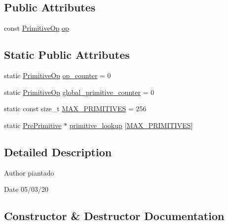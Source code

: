 \subsection*{Public Attributes}
\begin{DoxyCompactItemize}
\item 
const \hyperlink{_instruction_8h_a227278394efd1e2313c727102db09ea9}{Primitive\+Op} \hyperlink{struct_pre_primitive_a209912eb2296e524388fa1f83e7d834b}{op}
\end{DoxyCompactItemize}
\subsection*{Static Public Attributes}
\begin{DoxyCompactItemize}
\item 
static \hyperlink{_instruction_8h_a227278394efd1e2313c727102db09ea9}{Primitive\+Op} \hyperlink{struct_pre_primitive_a8f4088dc0a3fe00fd81c509bb0af1881}{op\+\_\+counter} = 0
\item 
static \hyperlink{_instruction_8h_a227278394efd1e2313c727102db09ea9}{Primitive\+Op} \hyperlink{struct_pre_primitive_a42ca9726dd60d24f8148e766d5e8ecc8}{global\+\_\+primitive\+\_\+counter} = 0
\item 
static const size\+\_\+t \hyperlink{struct_pre_primitive_aaa931d0f215c4a79ab4920c13a82a32b}{M\+A\+X\+\_\+\+P\+R\+I\+M\+I\+T\+I\+V\+ES} = 256
\item 
static \hyperlink{struct_pre_primitive}{Pre\+Primitive} $\ast$ \hyperlink{struct_pre_primitive_a286cab59ea91d634e75f435cd9812dd1}{primitive\+\_\+lookup} \mbox{[}\hyperlink{struct_pre_primitive_aaa931d0f215c4a79ab4920c13a82a32b}{M\+A\+X\+\_\+\+P\+R\+I\+M\+I\+T\+I\+V\+ES}\mbox{]}
\end{DoxyCompactItemize}


\subsection{Detailed Description}
\begin{DoxyAuthor}{Author}
piantado 
\end{DoxyAuthor}
\begin{DoxyDate}{Date}
05/03/20 
\end{DoxyDate}


\subsection{Constructor \& Destructor Documentation}
\mbox{\label{struct_pre_primitive_a8a96c30ad34b1f19f0539eea4d0423f6}} 
